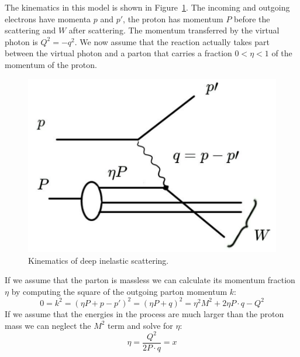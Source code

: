 \documentclass[12pt]{article}
\begin{document}
The kinematics in this model is shown in Figure~\ref{fig:DISkinematics}. The incoming and outgoing electrons have momenta $p$ and $p'$, the proton has momentum $P$ before the scattering and $W$ after scattering. The momentum transferred by the virtual photon is $Q^2=-q^2$. We now assume that the reaction actually takes part between the virtual photon and a parton that carries a fraction $0<\eta<1$ of the momentum of the proton. 
\begin{figure}[h]
\begin{center}
\includegraphics[scale=0.25]{images/DISkinematics.png}
\end{center}
\caption{Kinematics of deep inelastic scattering.}\label{fig:DISkinematics}
\end{figure}
If we assume that the parton is massless we can calculate its momentum fraction $\eta$ by computing the square of the outgoing parton momentum $k$:
\[0=k^2=\left(\eta P+p-p'\right)^2=\left(\eta P+q\right)^2=\eta^2M^2+2\eta P\cdot q-Q^2\]
If we assume that the energies in the process are much larger than the proton mass we can neglect the $M^2$ term and solve for $\eta$:
\[\eta=\frac{Q^2}{2P\cdot q}=x\] 
\end{document}

